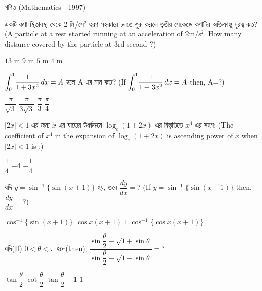 \documentclass[addpoints]{exam}
\begin{document}
\begin{LARGE}
\begin{center}
গণিত (Mathematics - 1997)
\end{center}
\end{LARGE}
\begin{questions}

\question একটি কণা স্থিতাবস্থা থেকে 2 মি/সে$ ^{2} $ ত্বরণ সহকারে চলতে শুরু করলে তৃতীয় সেকেন্ডে কণাটির অতিক্রান্তু দুরত্ব কত? (A particle at a rest started running at an acceleration of 2m/s$ ^{2} $. How many distance covered by the particle at 3rd second ?)

\begin{oneparchoices}
\choice $ 13 $ m
\choice $ 9 $ m
\choice $ 5 $ m
\choice $ 4 $ m
\end{oneparchoices}

\question $ \mathlarger{\int_{0}^{1}}\dfrac{1}{1+3x^{2}}\,dx =A $ হলে A এর মান কত? (If $ \mathlarger{\int_{0}^{1}}\dfrac{1}{1+3x^{2}}\,dx =A $ then, A=?)

\begin{oneparchoices}
\choice $ \dfrac{\pi}{\sqrt{3}} $ 
\choice $ \dfrac{\pi}{3\sqrt{3}} $ 
\choice $ \dfrac{\pi}{3} $
\choice $ \dfrac{\pi}{4} $
\end{oneparchoices}

\question  $ |2x|<1 $ এর জন্য $ x $ এর ঘাতের উর্ধ্বক্রমে $ \log_{e}(1+2x) $ এর বিস্তৃতিতে $ x^{4} $ এর সহগ: (The coefficient of $ x^{4} $ in the expansion of $ \log_{e}(1+2x) $ is ascending power of $ x $ when $ |2x|<1 $ is :)

\begin{oneparchoices}
\choice $ \dfrac{1}{4} $
\choice $ -4 $
\choice $ -\dfrac{1}{4} $
\end{oneparchoices}


\question  যদি $ y=\sin^{-1}\{\sin(x+1)\} $  হয়, তবে $ \dfrac{dy}{dx} = ? $ (If $ y=\sin^{-1}\{\sin(x+1)\} $ then, $ \dfrac{dy}{dx} = ? $)

\begin{oneparchoices}
\choice $ \cos^{-1}\{\sin(x+1)\} $
\choice $ \cos x (x+1) $
\choice $ 1 $
\choice $ \cos^{-1}\{\cos x(x+1)\} $
\end{oneparchoices}

\question যদি(If) $ 0<\theta<\pi $ হলে(then),  $ \dfrac{\sin\dfrac{\theta}{2}-\sqrt{1+\sin \theta}}{\sin\dfrac{\theta}{2}-\sqrt{1-\sin \theta}} =?$ 


\begin{oneparchoices}
\choice $ \tan\dfrac{\theta}{2} $
\choice $ \cot\dfrac{\theta}{2} $
\choice $ \tan\dfrac{\theta}{2} -1 $
\choice $ 1 $
\end{oneparchoices}


\end{questions}
\end{document}
